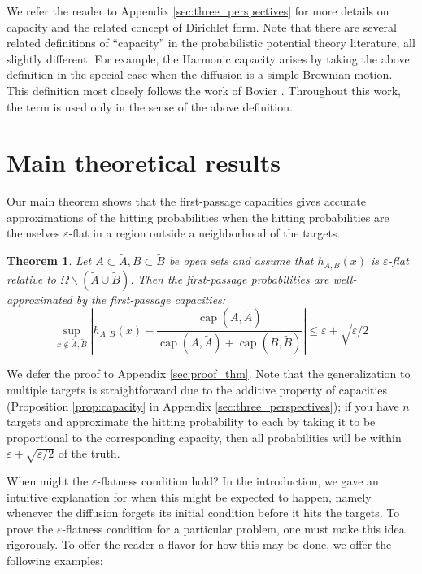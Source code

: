 \documentclass[12pt, nofootinbib,english, amsmath, amssymb, aps, priprint, graphicx,floatfix]{revtex4-1}
\newtheorem{theorem}{Theorem}
\theoremstyle{plain}
\theoremstyle{definition}
\theoremstyle{plain}
\newcommand{\capac}[2]{\ensuremath{\operatorname{cap}}(#1,#2)}
\begin{document}
We refer the reader to Appendix \ref{sec:three_perspectives} for more details on capacity and the related concept of Dirichlet form.  Note that there are several related definitions of ``capacity'' in the probabilistic potential theory literature, all slightly different.  For example, the Harmonic capacity arises by taking the above definition in the special case when the diffusion is a simple Brownian motion.  This definition most closely follows the work of Bovier \cite{Bovier2016-ez,Bovier2004-wj}.  Throughout this work, the term is used only in the sense of the above definition. 

\section{Main theoretical results}
\label{sec:MainResults}

Our main theorem shows that the first-passage capacities gives accurate approximations of the hitting probabilities when the hitting probabilities are themselves $\varepsilon$-flat in a region outside a neighborhood of the targets.

\begin{theorem}\label{thm:main_thm}  
Let $A\subset \tilde A,B\subset \tilde B$ be open sets and assume that  $h_{A,B}(x)$ is $\varepsilon$-flat relative to 
$\Omega \backslash (\tilde A \cup \tilde B)$.
Then the first-passage probabilities are well-approximated by the first-passage capacities:
\[ \sup_{x \notin \tilde A,\tilde B} \left| h_{A,B} (x) - \frac{\capac{A}{\tilde A}}{\capac{A}{\tilde A}+\capac{B}{\tilde B}} \right| \leqslant \varepsilon + \sqrt{\varepsilon/2} \]
\end{theorem}

We defer the proof to Appendix \ref{sec:proof_thm}.  Note that the generalization to multiple targets is straightforward due to the additive property of capacities (Proposition \ref{prop:capacity} in Appendix \ref{sec:three_perspectives}); if you have $n$ targets and approximate the hitting probability to each by taking it to be proportional to the corresponding capacity, then all probabilities will be within $\varepsilon+\sqrt{\varepsilon/2}$ of the truth.

When might the $\varepsilon$-flatness condition hold?  In the introduction, we gave an intuitive explanation for when this might be expected to happen, namely whenever the diffusion forgets its initial condition before it hits the targets.  To prove the $\varepsilon$-flatness condition for a particular problem, one must make this idea rigorously.  To offer the reader a flavor for how this may be done, we offer the following examples:
\end{document}
